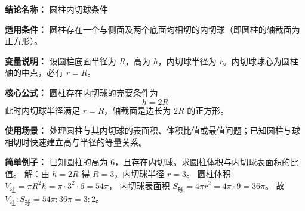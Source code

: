 \textbf{结论名称：} 圆柱内切球条件

\textbf{适用条件：} 圆柱存在一个与侧面及两个底面均相切的内切球（即圆柱的轴截面为正方形）。

\textbf{变量说明：} 设圆柱底面半径为 \(R\)，高为 \(h\)，内切球半径为 \(r\)。内切球球心为圆柱轴的中点，必有 \(r=R\)。

\textbf{核心公式：} 圆柱存在内切球的充要条件为
\[
\boxed{h = 2R}
\]
此时内切球半径满足 \(r = R\)，轴截面是边长为 \(2R\) 的正方形。

\textbf{使用场景：} 处理圆柱与其内切球的表面积、体积比值或最值问题；已知圆柱与球相切时快速建立高与半径的等量关系。

\textbf{简单例子：} 已知圆柱的高为 \(6\)，且存在内切球。求圆柱体积与内切球表面积的比值。
解：由 \(h=2R\) 得 \(R=3\)，内切球半径 \(r=3\)。
圆柱体积 \(V_{\text{柱}} = \pi R^{2} h = \pi \cdot 3^{2} \cdot 6 = 54\pi\)，
内切球表面积 \(S_{\text{球}} = 4\pi r^{2} = 4\pi \cdot 9 = 36\pi\)。
故 \(V_{\text{柱}} : S_{\text{球}} = 54\pi : 36\pi = 3:2\)。